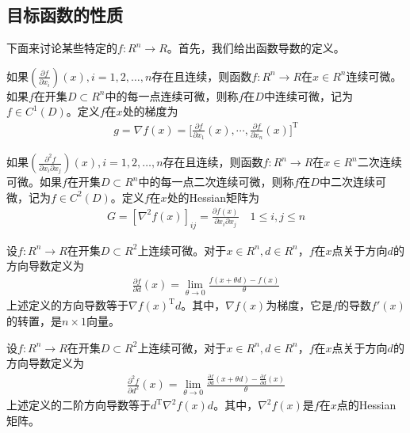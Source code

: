     \subsection{目标函数的性质}
        \par
        下面来讨论某些特定的$f:R^n \rightarrow R$。首先，我们给出函数导数的定义。
        \begin{definition}[一阶导数]
        如果$\left( \frac {\partial f}{\partial x_i} \right) (x),i=1,2,\ldots,n$存在且连续，则函数$f:R^n \rightarrow R$在$x\in R^n$连续可微。如果$f$在开集$D\subset R^n$中的每一点连续可微，则称$f$在$D$中连续可微，记为$f \in C^1 (D)$。定义$f$在$x$处的梯度为
        \begin{align*}
            g = \nabla f(x) = \bigg[{\frac{\partial f}{\partial x_1}}(x), \cdots ,{\frac{\partial f}{\partial x_n}}(x)\bigg]^\mathrm{T}
        \end{align*}
        \end{definition}
        \begin{definition}[二阶导数]
        如果$\left( \frac {\partial^2 f}{\partial x_i\partial x_j} \right) (x),i=1,2,\ldots,n$存在且连续，则函数$f:R^n \rightarrow R$在$x\in R^n$二次连续可微。如果$f$在开集$D\subset R^n$中的每一点二次连续可微，则称$f$在$D$中二次连续可微，记为$f \in C^{2}(D)$。定义$f$在$x$处的Hessian矩阵为
        \begin{align*}
        G = [\nabla ^2f(x)]_{ij} = \frac{\partial f(x)}{\partial {x_i}\partial {x_j}}  \quad 1\le i,j \le n
        \end{align*}
        \end{definition}
        \par
        设$f:R^n \rightarrow R$在开集$D\subset R^2$上连续可微。对于$x\in R^n,d\in R^n$，$f$在$x$点关于方向$d$的方向导数定义为
        \begin{align*}
        \frac{\partial f}{\partial d}(x) = \mathop {\lim }\limits_{\theta \to 0} \frac{f(x+\theta d)-f(x)}{\theta }
        \end{align*}
        上述定义的方向导数等于$\nabla {f(x)}^\mathrm{T} d$。其中，$\nabla {f(x)}$为梯度，它是$f$的导数$f'(x)$的转置，是$n \times 1$向量。
        \par
        设$f:R^n \rightarrow R$在开集$D\subset R^2$上连续可微，对于$x\in R^n,d\in R^n$，$f$在$x$点关于方向$d$的方向导数定义为
        \begin{align*}
        \frac{{\partial}^2 f}{\partial d^{2}}(x) = \mathop {\lim }\limits_{\theta \to 0} \frac{{\frac {\partial f}{\partial d}}(x+\theta d)-{\frac {\partial f}{\partial d}}(x)}{\theta }
        \end{align*}
        上述定义的二阶方向导数等于$d^\mathrm{T}{\nabla^2} f(x) d$。其中，${\nabla^2} f(x)$是$f$在$x$点的Hessian矩阵。
